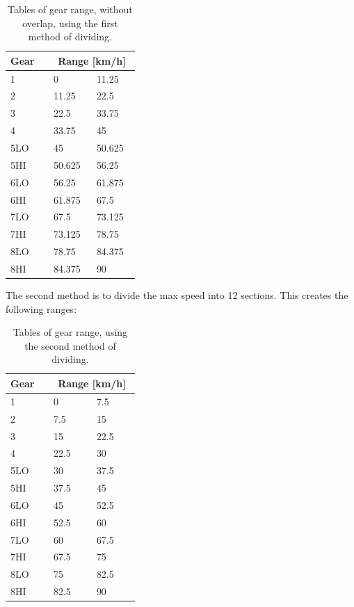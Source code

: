 \documentclass[noprint]{uit-thesis}
\begin{document}
\begin{table}[H]
\renewcommand{\arraystretch}{1.15}
\center
\begin{tabular}{| p{0.3\linewidth} | p{0.3\linewidth} | p{0.3\linewidth} |} 

 \hline
 \textbf{Gear} & \multicolumn{2}{|c|}{\textbf{Range [km/h]}} \\
 \hline 
1 & 0 & 11.25 \\
2 & 11.25 & 22.5 \\
3 & 22.5 & 33.75 \\
4 & 33.75 & 45 \\
5LO & 45 & 50.625 \\
5HI & 50.625 & 56.25 \\
6LO & 56.25 & 61.875 \\
6HI & 61.875 & 67.5 \\
7LO & 67.5 & 73.125 \\
7HI & 73.125 & 78.75 \\
8LO & 78.75 & 84.375 \\
8HI & 84.375 & 90 \\
 \hline
\end{tabular}
\caption{Tables of gear range, without overlap, using the first method of dividing.}
\label{tab:gearsM1}
\end{table}


The second method is to divide the max speed into 12 sections. This creates the following ranges:

\begin{table}[H]
\center
\begin{tabular}{| p{0.3\linewidth} | p{0.3\linewidth} | p{0.3\linewidth} |} 

 \hline
 \textbf{Gear} & \multicolumn{2}{|c|}{\textbf{Range [km/h]}} \\
 \hline 
1 & 0 & 7.5 \\
2 & 7.5 & 15 \\
3 & 15 & 22.5 \\
4 & 22.5 & 30 \\
5LO & 30 & 37.5 \\
5HI & 37.5 & 45 \\
6LO & 45 & 52.5 \\
6HI & 52.5 & 60 \\
7LO & 60 & 67.5 \\
7HI & 67.5 & 75 \\
8LO & 75 & 82.5 \\
8HI & 82.5 & 90 \\
 \hline
\end{tabular}
\caption{Tables of gear range, using the second method of dividing.}
\label{tab:gearsM2}
\end{table}
\end{document}

